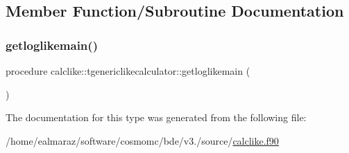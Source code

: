 \subsection{Member Function/\+Subroutine Documentation}
\mbox{\label{structcalclike_1_1tgenericlikecalculator_ad935f0fe5ea6abeb062e58f45e46ec7c}} 
\subsubsection{\texorpdfstring{getloglikemain()}{getloglikemain()}}
{\footnotesize\ttfamily procedure calclike\+::tgenericlikecalculator\+::getloglikemain (\begin{DoxyParamCaption}{ }\end{DoxyParamCaption})\hspace{0.3cm}{\ttfamily [private]}}



The documentation for this type was generated from the following file\+:\begin{DoxyCompactItemize}
\item 
/home/ealmaraz/software/cosmomc/bde/v3./source/\mbox{\hyperlink{calclike_8f90}{calclike.\+f90}}\end{DoxyCompactItemize}
